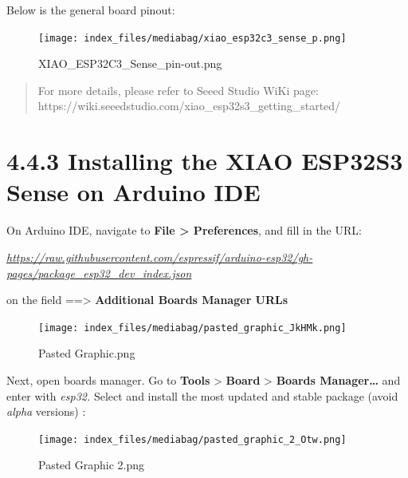 \documentclass[
  letterpaper,
  DIV=11,
  numbers=noendperiod]{scrreprt}
\begin{document}
Below is the general board pinout:

\begin{figure}[H]

{\centering \texttt{[image: index\_files/mediabag/xiao\_esp32c3\_sense\_p.png]}

}

\caption{XIAO\_ESP32C3\_Sense\_pin-out.png}

\end{figure}

\begin{quote}
For more details, please refer to Seeed Studio WiKi page:
https://wiki.seeedstudio.com/xiao\_esp32s3\_getting\_started/
\end{quote}

\hypertarget{installing-the-xiao-esp32s3-sense-on-arduino-ide-1}{%
\section*{4.4.3 Installing the XIAO ESP32S3 Sense on Arduino
IDE}\label{installing-the-xiao-esp32s3-sense-on-arduino-ide-1}}


On Arduino IDE, navigate to \textbf{File \textgreater{} Preferences},
and fill in the URL:

\href{https://raw.githubusercontent.com/espressif/arduino-esp32/gh-pages/package_esp32_dev_index.json}{\emph{https://raw.githubusercontent.com/espressif/arduino-esp32/gh-pages/package\_esp32\_dev\_index.json}}

on the field ==\textgreater{} \textbf{Additional Boards Manager URLs}

\begin{figure}[H]

{\centering \texttt{[image: index\_files/mediabag/pasted\_graphic\_JkHMk.png]}

}

\caption{Pasted Graphic.png}

\end{figure}

Next, open boards manager. Go to \textbf{Tools} \textgreater{}
\textbf{Board} \textgreater{} \textbf{Boards Manager\ldots{}} and enter
with \emph{esp32.} Select and install the most updated and stable
package (avoid \emph{alpha} versions) :

\begin{figure}[H]

{\centering \texttt{[image: index\_files/mediabag/pasted\_graphic\_2\_Otw.png]}

}

\caption{Pasted Graphic 2.png}

\end{figure}
\end{document}
